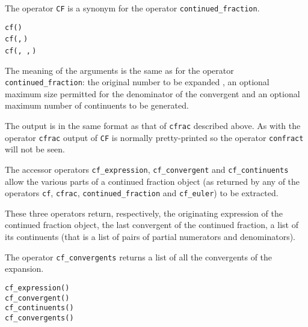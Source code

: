 \hypertarget{operator:CF}{}

The operator \texttt{CF}  is a
synonym for the operator \texttt{continued\_fraction}.
\begin{syntaxtable}
  \texttt{cf(}\texttt{)}\\
  \texttt{cf(}\texttt{,}\,\texttt{)}\\
  \texttt{cf(}\texttt{,}\,%
  \texttt{,}\,\texttt{)}
\end{syntaxtable}

The meaning of the arguments is the same as for the operator
\texttt{continued\_fraction}: the original number to be expanded
, an optional maximum size  permitted for the
denominator of the convergent and an optional maximum number of continuents
 to be generated.

The output is in the same format as that of \texttt{cfrac} described above.
As with the operator \texttt{cfrac} output of \texttt{CF} is normally
pretty-printed so the operator \texttt{confract} will not be seen.

\hypertarget{operator:CF_EXPRESSION}{}
\hypertarget{operator:CF_CONTINUENTS}{}
\hypertarget{operator:CF_CONVERGENT}{}
\hypertarget{operator:CF_CONVERGENTS}{}

The accessor operators \texttt{cf\_expression},
\texttt{cf\_convergent} and
\texttt{cf\_continuents} allow
the various parts of a continued fraction object 
(as returned by any of the operators \texttt{cf}, \texttt{cfrac},
\texttt{continued\_fraction} and \texttt{cf\_euler}) to be extracted.

These three operators return, respectively, the originating
expression of the continued fraction object, the last convergent of the
continued fraction, a list of its continuents
(that is a list of pairs of partial numerators and denominators).

The operator \texttt{cf\_convergents} 
returns a list of all the convergents of the expansion.
\begin{syntaxtable}
  \texttt{cf\_expression(}\texttt{)} \\
  \texttt{cf\_convergent(}\texttt{)} \\
  \texttt{cf\_continuents(}\texttt{)} \\
  \texttt{cf\_convergents(}\texttt{)}
\end{syntaxtable}

